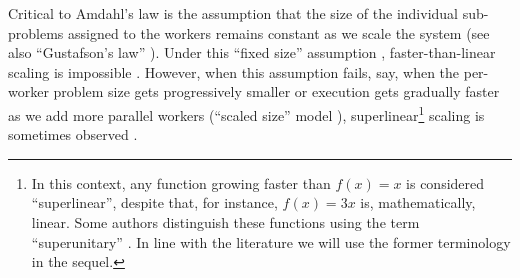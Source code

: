 Critical to Amdahl's law is the assumption that the size of the individual sub-problems assigned to the workers remains constant as we scale the system (see also ``Gustafson's law'' \cite{10.1145/42411.42415}). Under this ``fixed size'' assumption \cite{556383}, faster-than-linear scaling is impossible \cite{10.1016/0167-8191(86)90024-4}. However, when this assumption fails, say, when the per-worker problem size gets progressively smaller or execution gets gradually faster as we add more parallel workers (``scaled size'' model \cite{556383}), superlinear\footnote{In this context, any function growing faster than $f(x) = x$ is considered ``superlinear'', despite that, for instance, $f(x) = 3x$ is, mathematically, linear. Some authors distinguish these functions using the term ``superunitary'' \cite{80148}. In line with the literature we will use the former terminology in the sequel.} scaling is sometimes observed \cite{scalability-analyzed, sdn-analytitcs, 6483679, 10.1007/978-3-319-77610-1, dobb-1, dobb-2}. 



